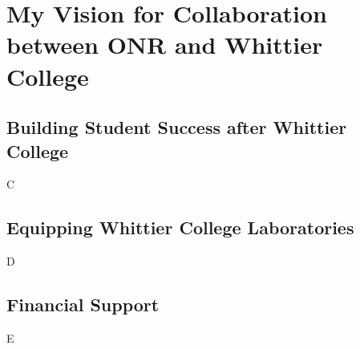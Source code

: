 \documentclass[../../../main.tex]{subfiles}
\begin{document}
\section{My Vision for Collaboration between ONR and Whittier College}
\label{sec:naval_collaboration}

\subsection{Building Student Success after Whittier College}
C
\subsection{Equipping Whittier College Laboratories}
D
\subsection{Financial Support}
E
\end{document}
